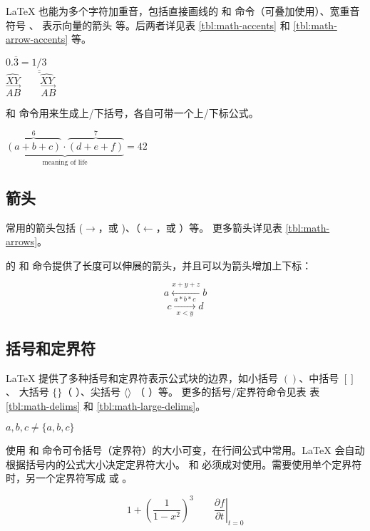\LaTeX{} 也能为多个字符加重音，包括直接画线的  和  命令（可叠加使用）、宽重音符号 、
表示向量的箭头  等。后两者详见表 \ref{tbl:math-accents} 和 \ref{tbl:math-arrow-accents} 等。
\begin{example}
$0.\overline{3} =
\underline{\underline{1/3}}$ \\[5pt]
$\hat{XY} \qquad \widehat{XY}$\\[5pt]
$\vec{AB} \qquad
\overrightarrow{AB}$
\end{example}

 和  命令用来生成上/下括号，各自可带一个上/下标公式。
\begin{example}
$\underbrace{\overbrace{(a+b+c)}^6
\cdot \overbrace{(d+e+f)}^7}
_\text{meaning of life} = 42$
\end{example}

\subsection{箭头}\label{subsec:math-arrows}

常用的箭头包括  ($\rightarrow$，或 )、（$\leftarrow$，或 ）等。
更多箭头详见表 \ref{tbl:math-arrows}。

 的  和  命令提供了长度可以伸展的箭头，并且可以为箭头增加上下标：
\begin{example}
\[ a\xleftarrow{x+y+z} b \]
\[ c\xrightarrow[x<y]{a*b*c}d \]
\end{example}

\subsection{括号和定界符}\label{subsec:math-delims}

\LaTeX{} 提供了多种括号和定界符表示公式块的边界，如小括号 $()$、中括号 $[]$、
大括号 $\{\}$（\cmd{\{} \cmd{\}}）、尖括号 $\langle \rangle$ （ ）等。
更多的括号/定界符命令见表 表 \ref{tbl:math-delims} 和 \ref{tbl:math-large-delims}。
\begin{example}
${a,b,c} \neq \{a,b,c\}$
\end{example}

使用  和  命令可令括号（定界符）的大小可变，在行间公式中常用。\LaTeX{} 会自动根据括号内的公式大小决定定界符大小。
 和  必须成对使用。需要使用单个定界符时，另一个定界符写成  或 。
\begin{example}
\[1 + \left(\frac{1}{1-x^{2}}
\right)^3 \qquad
\left.\frac{\partial f}{\partial t}
\right|_{t=0}\]
\end{example}

